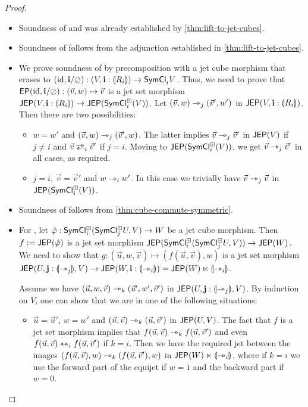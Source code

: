 \documentclass[a4paper]{article}
\begin{document}
\begin{proof}
\begin{itemize}
		\item Soundness of  and  was already established by \cref{thm:lift-to-jet-cubes}.
		
		\item Soundness of  follows from the adjunction established in \cref{thm:lift-to-jet-cubes}.
		
		\item We prove soundness of  by precomposition with a jet cube morphism that erases to $(\mathrm{id}, \mathbf{i} / \oslash) : (V, \mathbf{i} : {\llparenthesis R_i \rrparenthesis}) \to \mathsf{SymCl}_i V$.
		Thus, we need to prove that $\mathsf{EP}(\mathrm{id}, \mathbf{i} / \oslash) : (\vec v, w) \mapsto \vec v$ is a jet set morphism $\mathsf{JEP}(V, \mathbf{i} : {\llparenthesis R_i \rrparenthesis})
		\to \mathsf{JEP}(\mathsf{SymCl}^\boxdot_i(V))$.
		Let $(\vec v, w) \rightarrowtriangle_j (\vec v', w')$ in $\mathsf{JEP}(V, \mathbf{i} : {\llparenthesis R_i \rrparenthesis})$.
		Then there are two possibilities:
		\begin{itemize}
			\item $w = w'$ and $(\vec v, w) \rightarrowtriangle_j (\vec v', w)$. The latter implies $\vec v \rightarrowtriangle_j \vec v'$ in $\mathsf{JEP}(V)$ if $j \neq i$ and $\vec v \infrajet_i \vec v'$ if $j = i$. Moving to $\mathsf{JEP}(\mathsf{SymCl}^\boxdot_i(V))$, we get $\vec v \rightarrowtriangle_j \vec v'$ in all cases, as required.
			\item $j = i$, $\vec v = \vec v'$ and $w \rightarrowtriangle_i w'$. In this case we trivially have $\vec v \rightarrowtriangle_j \vec v$ in $\mathsf{JEP}(\mathsf{SymCl}^\boxdot_i(V))$.
		\end{itemize}
		
		\item Soundness of  follows from \cref{thm:cube-commute-symmetric}.
		
		\item {} For , let $\hat {\varphi} : \mathsf{SymCl}^\boxdot_i(\mathsf{SymCl}^\boxdot_j U, V) \to W$ be a jet cube morphism.
		Then $f := \mathsf{JEP}(\hat {\varphi})$ is a jet set morphism $\mathsf{JEP}(\mathsf{SymCl}^\boxdot_i(\mathsf{SymCl}^\boxdot_j U, V)) \to \mathsf{JEP}(W)$.
		We need to show that $g : (\vec u, w, \vec v) \mapsto (f(\vec u, \vec v), w)$ is a jet set morphism $\mathsf{JEP}(U, \mathbf{j} : {\llparenthesis \rightarrowtriangle_j \rrparenthesis}, V) \to \mathsf{JEP}(W, \mathbf{i} : {\llparenthesis \rightarrowtriangle_i \rrparenthesis}) = \mathsf{JEP}(W) \ltimes {\llparenthesis \rightarrowtriangle_i \rrparenthesis}$.
		
		Assume we have $(\vec u, w, \vec v) \rightarrowtriangle_k (\vec u', w', \vec v')$ in $\mathsf{JEP}(U, \mathbf{j} : {\llparenthesis \rightarrowtriangle_j \rrparenthesis}, V)$.
		By induction on $V$, one can show that we are in one of the following situations:
		\begin{itemize}
			\item $\vec u = \vec u'$, $w = w'$ and $(\vec u, \vec v) \rightarrowtriangle_k (\vec u, \vec v')$ in $\mathsf{JEP}(U, V)$.
			The fact that $f$ is a jet set morphism implies that $f(\vec u, \vec v) \rightarrowtriangle_k f(\vec u, \vec v')$ and even $f(\vec u, \vec v) \leftrightarrowtriangle_i f(\vec u, \vec v')$ if $k = i$.
			Then we have the required jet between the images $(f(\vec u, \vec v), w) \rightarrowtriangle_k (f(\vec u, \vec v'), w)$ in $\mathsf{JEP}(W) \ltimes {\llparenthesis \rightarrowtriangle_i \rrparenthesis}$, where if $k = i$ we use the forward part of the equijet if $w = 1$ and the backward part if $w = 0$.
			

\end{itemize}
\end{itemize}
\end{proof}
\end{document}
